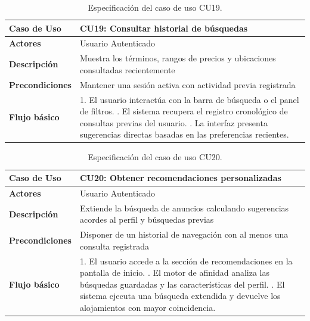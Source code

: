 \begin{table}[H]
\centering
\begin{tabular}{|p{3.1cm}|p{10.9cm}|}
\hline
\textbf{Caso de Uso} & \textbf{CU19: Consultar historial de búsquedas} \\ \hline
\textbf{Actores} & Usuario Autenticado \\ \hline
\textbf{Descripción} & Muestra los términos, rangos de precios y ubicaciones consultadas recientemente \\ \hline
\textbf{Precondiciones} & Mantener una sesión activa con actividad previa registrada \\ \hline
\textbf{Flujo básico} & 
1. El usuario interactúa con la barra de búsqueda o el panel de filtros. \newline
2. El sistema recupera el registro cronológico de consultas previas del usuario. \newline
3. La interfaz presenta sugerencias directas basadas en las preferencias recientes. \\ \hline
\end{tabular}
\caption{Especificación del caso de uso CU19.}
\label{tab:cu19}
\end{table}

\begin{table}[H]
\centering
\begin{tabular}{|p{3.1cm}|p{10.9cm}|}
\hline
\textbf{Caso de Uso} & \textbf{CU20: Obtener recomendaciones personalizadas} \\ \hline
\textbf{Actores} & Usuario Autenticado \\ \hline
\textbf{Descripción} & Extiende la búsqueda de anuncios calculando sugerencias acordes al perfil y búsquedas previas \\ \hline
\textbf{Precondiciones} & Disponer de un historial de navegación con al menos una consulta registrada \\ \hline
\textbf{Flujo básico} & 
1. El usuario accede a la sección de recomendaciones en la pantalla de inicio. \newline
2. El motor de afinidad analiza las búsquedas guardadas y las características del perfil. \newline
3. El sistema ejecuta una búsqueda extendida y devuelve los alojamientos con mayor coincidencia. \\ \hline
\end{tabular}
\caption{Especificación del caso de uso CU20.}
\label{tab:cu20}
\end{table}

